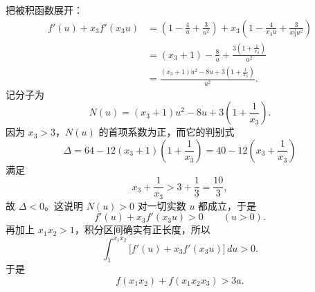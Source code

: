 \begin{solution}
把被积函数展开：
\begin{align*}
f'(u)+x_3f'(x_3u)
&=\left(1-\frac4u+\frac3{u^2}\right)+x_3\left(1-\frac4{x_3u}+\frac3{x_3^2u^2}\right) \\
&=(x_3+1)-\frac8u+\frac{3\left(1+\frac1{x_3}\right)}{u^2} \\
&=\frac{(x_3+1)u^2-8u+3\left(1+\frac1{x_3}\right)}{u^2}.
\end{align*}
记分子为
\[
N(u)=(x_3+1)u^2-8u+3\left(1+\frac1{x_3}\right).
\]
因为 $x_3>3$，$N(u)$ 的首项系数为正，而它的判别式
\[
\Delta
=64-12(x_3+1)\left(1+\frac1{x_3}\right)
=40-12\left(x_3+\frac1{x_3}\right)
\]
满足
\[
x_3+\frac1{x_3}>3+\frac13=\frac{10}{3},
\]
故 $\Delta<0$。这说明 $N(u)>0$ 对一切实数 $u$ 都成立，于是
\[
f'(u)+x_3f'(x_3u)>0\qquad (u>0).
\]
再加上 $x_1x_2>1$，积分区间确实有正长度，所以
\[
\int_1^{x_1x_2}\bigl[f'(u)+x_3f'(x_3u)\bigr]\,du>0.
\]
于是
\[
f(x_1x_2)+f(x_1x_2x_3)>3a.
\]
\end{solution}

